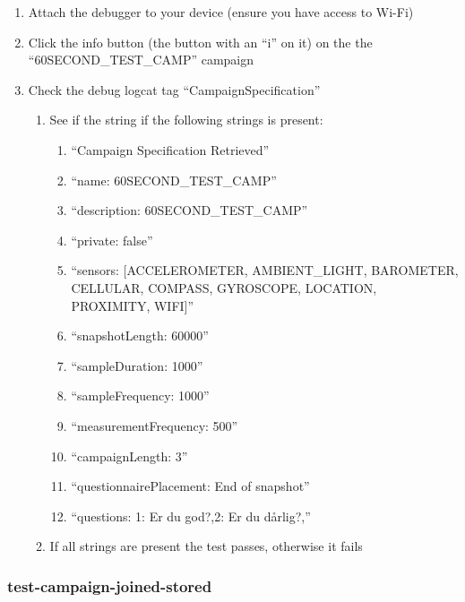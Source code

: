 \begin{enumerate}
    \item Attach the debugger to your device (ensure you have access to Wi-Fi)
    \item Click the info button (the button with an ``i'' on it) on the the ``60SECOND\_TEST\_CAMP'' campaign
    \item Check the debug logcat tag ``CampaignSpecification''
        \begin{enumerate}
            \item See if the string if the following strings is present:
                \begin{enumerate}
                        \item ``Campaign Specification Retrieved''
                        \item ``name: 60SECOND\_TEST\_CAMP''
                        \item ``description: 60SECOND\_TEST\_CAMP''
                        \item ``private: false'' 
                        \item ``sensors: [ACCELEROMETER, AMBIENT\_LIGHT, BAROMETER, CELLULAR, COMPASS, GYROSCOPE, LOCATION, PROXIMITY, WIFI]''
                        \item ``snapshotLength: 60000''
                        \item ``sampleDuration: 1000''
                        \item ``sampleFrequency: 1000''
                        \item ``measurementFrequency: 500''
                        \item ``campaignLength: 3''
                        \item ``questionnairePlacement: End of snapshot''
                        \item ``questions: 1: Er du god?,2: Er du dårlig?,''
                \end{enumerate}
            \item If all strings are present the test passes, otherwise it fails
        \end{enumerate}
\end{enumerate}

\subsubsection{test-campaign-joined-stored}

